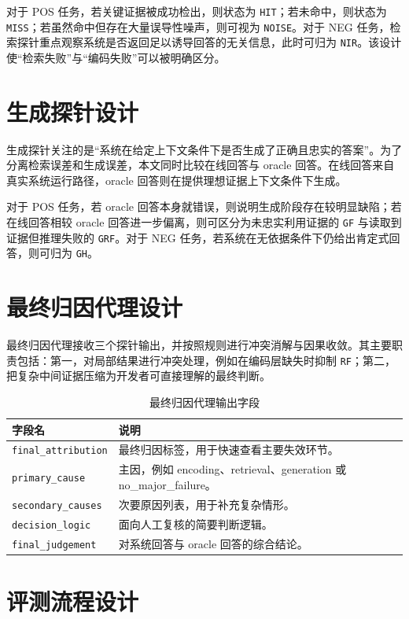 对于 POS 任务，若关键证据被成功检出，则状态为 \texttt{HIT}；若未命中，则状态为 \texttt{MISS}；若虽然命中但存在大量误导性噪声，则可视为 \texttt{NOISE}。对于 NEG 任务，检索探针重点观察系统是否返回足以诱导回答的无关信息，此时可归为 \texttt{NIR}。该设计使“检索失败”与“编码失败”可以被明确区分。

\section{生成探针设计}

生成探针关注的是“系统在给定上下文条件下是否生成了正确且忠实的答案”。为了分离检索误差和生成误差，本文同时比较在线回答与 oracle 回答。在线回答来自真实系统运行路径，oracle 回答则在提供理想证据上下文条件下生成。

对于 POS 任务，若 oracle 回答本身就错误，则说明生成阶段存在较明显缺陷；若在线回答相较 oracle 回答进一步偏离，则可区分为未忠实利用证据的 \texttt{GF} 与读取到证据但推理失败的 \texttt{GRF}。对于 NEG 任务，若系统在无依据条件下仍给出肯定式回答，则可归为 \texttt{GH}。

\section{最终归因代理设计}

最终归因代理接收三个探针输出，并按照规则进行冲突消解与因果收敛。其主要职责包括：第一，对局部结果进行冲突处理，例如在编码层缺失时抑制 \texttt{RF}；第二，把复杂中间证据压缩为开发者可直接理解的最终判断。

\begin{table}[htbp]
\centering
\caption{最终归因代理输出字段}
\label{tab:attr-output}
\begin{tabular}{p{}p{}}
\toprule
字段名 & 说明 \\
\midrule
\texttt{final\_attribution} & 最终归因标签，用于快速查看主要失效环节。 \\
\texttt{primary\_cause} & 主因，例如 encoding、retrieval、generation 或 no\_major\_failure。 \\
\texttt{secondary\_causes} & 次要原因列表，用于补充复杂情形。 \\
\texttt{decision\_logic} & 面向人工复核的简要判断逻辑。 \\
\texttt{final\_judgement} & 对系统回答与 oracle 回答的综合结论。 \\
\bottomrule
\end{tabular}
\end{table}

\section{评测流程设计}

